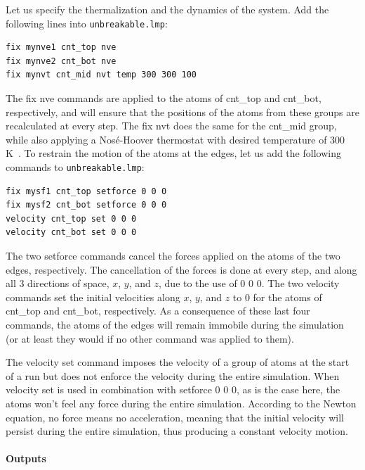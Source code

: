 \documentclass[9pt,tutorial]{livecoms}
\newcommand{\lmpcmd}[1]{\hspace{0pt}\colorbox{listing}{\textcolor{command}{\small{#1}}}\hspace{0pt}} %
\newcommand{\lmpcmdnote}[1]{\hspace{0pt}\colorbox{note_listing}{\textcolor{command}{\small{#1}}}\hspace{0pt}} %
\newcommand{\flecmd}[1]{\textcolor{command}{\texttt{#1}}} %
\begin{document}
Let us specify the thermalization and the dynamics of the system.  Add the following
lines into \flecmd{unbreakable.lmp}:
\begin{lstlisting}
fix mynve1 cnt_top nve
fix mynve2 cnt_bot nve
fix mynvt cnt_mid nvt temp 300 300 100
\end{lstlisting}
The \lmpcmd{fix nve} commands are applied to the atoms of \lmpcmd{cnt\_top} and
\lmpcmd{cnt\_bot}, respectively, and will ensure that the positions of the atoms
from these groups are recalculated at every step.  The \lmpcmd{fix nvt} does the
same for the \lmpcmd{cnt\_mid} group, while also applying a Nos\'e-Hoover thermostat
with desired temperature of 300\,K~\cite{nose1984unified, hoover1985canonical}.
To restrain the motion of the atoms at the edges, let us add the following
commands to \flecmd{unbreakable.lmp}:
\begin{lstlisting}
fix mysf1 cnt_top setforce 0 0 0
fix mysf2 cnt_bot setforce 0 0 0
velocity cnt_top set 0 0 0
velocity cnt_bot set 0 0 0
\end{lstlisting}
The two \lmpcmd{setforce} commands cancel the forces applied on the atoms of the
two edges, respectively.  The cancellation of the forces is done at every step,
and along all 3 directions of space, $x$, $y$, and $z$, due to the use of
\lmpcmd{0 0 0}.  The two \lmpcmd{velocity} commands set the initial velocities
along $x$, $y$, and $z$ to 0 for the atoms of \lmpcmd{cnt\_top} and
\lmpcmd{cnt\_bot}, respectively.  As a consequence of these last four commands,
the atoms of the edges will remain immobile during the simulation (or at least
they would if no other command was applied to them).

\begin{note}
The \lmpcmdnote{velocity set}
command imposes the velocity of a group of atoms at the start of a run but does
not enforce the velocity during the entire simulation.  When \lmpcmdnote{velocity set}
is used in combination with \lmpcmdnote{setforce 0 0 0}, as is the case here, the
atoms won't feel any force during the entire simulation.  According to the Newton
equation, no force means no acceleration, meaning that the initial velocity
will persist during the entire simulation, thus producing a constant velocity motion.
\end{note}

\paragraph{Outputs}
\end{document}
